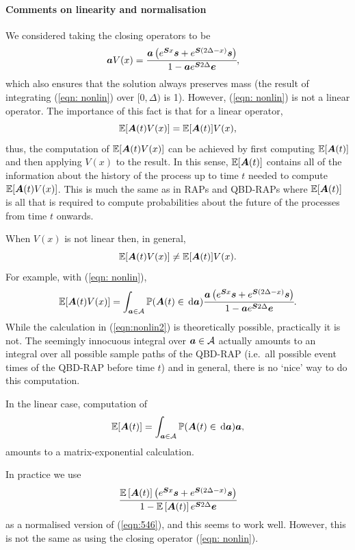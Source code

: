 	\paragraph{Comments on linearity and normalisation}
	We considered taking the closing operators to be 
	\begin{align}
		\boldsymbol a V(x) &= \cfrac{\boldsymbol a \left(e^{ \boldsymbol{S}x} \boldsymbol s + e^{ \boldsymbol{S}(2\Delta-x)} \boldsymbol s\right)}{1-\boldsymbol a e^{\boldsymbol S 2\Delta}\boldsymbol e},\label{eqn: nonlin}
	\end{align}
	which also ensures that the solution always preserves mass (the result of integrating (\ref{eqn: nonlin}) over \([0,\Delta)\) is 1). However, (\ref{eqn: nonlin}) is not a linear operator. The importance of this fact is that for a linear operator, 
	\[\mathbb E[\boldsymbol A(t) V(x)] = \mathbb E[\boldsymbol A(t)]V(x),\]
	thus, the computation of \(\mathbb E[\boldsymbol A(t) V(x)]\) can be achieved by first computing \(\mathbb E[\boldsymbol A(t)]\) and then applying \(V(x)\) to the result. In this sense, \(\mathbb E[\boldsymbol A(t)]\) contains all of the information about the history of the process up to time \(t\) needed to compute \(\mathbb E[\boldsymbol A(t) V(x)]\). This is much the same as in RAPs and QBD-RAPs where \(\mathbb E[\boldsymbol A(t)]\) is all that is required to compute probabilities about the future of the processes from time \(t\) onwards. 

	When \(V(x)\) is not linear then, in general, 
	\[\mathbb E[\boldsymbol A(t) V(x)] \neq \mathbb E[\boldsymbol A(t)]V(x).\]
	For example, with (\ref{eqn: nonlin}), 
	\begin{align}
		\mathbb E[\boldsymbol A(t) V(x)] = \int_{\boldsymbol a \in\mathcal A} \mathbb P(\boldsymbol A(t) \in \, \mathrm{d} \boldsymbol a) \cfrac{\boldsymbol a \left(e^{ \boldsymbol{S}x} \boldsymbol s + e^{ \boldsymbol{S}(2\Delta-x)} \boldsymbol s\right)}{1-\boldsymbol a e^{\boldsymbol S 2\Delta}\boldsymbol e}.\label{eqn:nonlin2}
	\end{align}
	While the calculation in (\ref{eqn:nonlin2}) is theoretically possible, practically it is not. The seemingly innocuous integral over \(\boldsymbol a \in\mathcal A\) actually amounts to an integral over all possible sample paths of the QBD-RAP (i.e.~all possible event times of the QBD-RAP before time \(t\)) and in general, there is no `nice' way to do this computation. 
	
	In the linear case, computation of
	\[\mathbb E[\boldsymbol A(t)] = \int_{\boldsymbol a\in\mathcal A} \mathbb P(\boldsymbol A(t) \in \, \mathrm{d} \boldsymbol a) \boldsymbol a,\]
	amounts to a matrix-exponential calculation. 

	In practice we use 
	\begin{align}
		\cfrac{\mathbb E\left[\boldsymbol A(t)\right] \left(e^{ \boldsymbol{S}x} \boldsymbol s + e^{ \boldsymbol{S}(2\Delta-x)} \boldsymbol s\right)}{1-\mathbb E\left[\boldsymbol A(t)\right] e^{\boldsymbol S 2\Delta}\boldsymbol e}
	\end{align}
	as a normalised version of (\ref{eqn:546}), and this seems to work well. However, this is not the same as using the closing operator (\ref{eqn: nonlin}).

